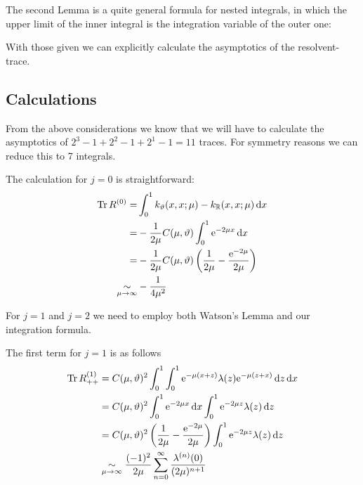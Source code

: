 The second Lemma is a quite general formula for nested integrals, in which the
upper limit of the inner integral is the integration variable of the outer one:

\begin{Remark}
\end{Remark}

With those given we can explicitly calculate the asymptotics of the
resolvent-trace.

\subsection{Calculations}
From the above considerations we know that we will have to calculate the
asymptotics of $2^3 - 1 + 2^2 - 1 + 2^1 - 1 = 11$ traces. For symmetry reasons
we can reduce this to 7 integrals.

The calculation for $j=0$ is straightforward:
\begin{align}
    \Tr R^{(0)} =& \Integ[1]{0}{x}{k_\theta(x,x;\mu) - k_\mathbb{R}(x,x;\mu)} \\
    =& -\frac1{2\mu} C(\mu,\theta) \Integ[1]{0}{x}{\Eto{-2\mu x}} \\
    =& -\frac1{2\mu} C(\mu,\theta) \left( \frac1{2\mu} - \frac{\Eto{-2\mu}}{2\mu} \right) \\
    \SimAs{\mu\to\infty}& -\frac1{4\mu^2}
    \label{eqn:jeq0}
\end{align}

For $j=1$ and $j=2$ we need to employ both Watson's Lemma and our integration
formula.

The first term for $j=1$ is as follows
\begin{align*}
    \Tr R^{(1)}_{++} &= C(\mu,\theta)^2
        \Integ[1]{0}{x}{
            \Integ[1]{0}{z}{\Eto{-\mu(x+z)}
                \lambda(z)\Eto{-\mu(z+x)}
            }
        }
        \\
        &= C(\mu,\theta)^2
            \Integ[1]{0}{x}{
                \Eto{-2\mu x}
            }
            \Integ[1]{0}{z}{\Eto{-2\mu z}\lambda(z)}
        \\
        &= C(\mu, \theta)^2 \left(
            \frac1{2\mu} - \frac{\Eto{-2\mu}}{2\mu}
           \right)
           \Integ[1]{0}{z}{\Eto{-2\mu z}\lambda(z)}
        \\
        &\SimAs{\mu\to\infty}
            \frac{(-1)^2}{2\mu}
            \sum_{n=0}^{\infty}\frac{\lambda^{(n)}(0)}{(2\mu)^{n+1}}
\end{align*}

